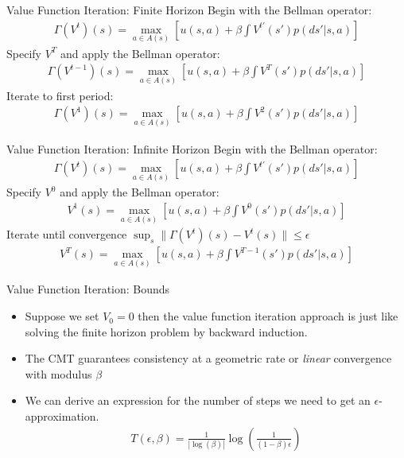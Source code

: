 \documentclass[xcolor=pdftex,dvipsnames,table,mathserif]{beamer}
\begin{document}
\begin{frame}{Value Function Iteration: Finite Horizon}
Begin with the Bellman operator:
\begin{eqnarray*}
\Gamma(V^t)(s) = \max_{a \in A(s)} \left[ u(s,a) + \beta \int V^{t'}(s')p(ds' | s,a) \right]
\end{eqnarray*}
Specify $V^T$ and apply the Bellman operator:
\begin{eqnarray*}
\Gamma(V^{t-1})(s) = \max_{a \in A(s)} \left[ u(s,a) + \beta \int V^{T}(s')p(ds' | s,a) \right]
\end{eqnarray*}
Iterate to first period:
\begin{eqnarray*}
\Gamma(V^1)(s) = \max_{a \in A(s)} \left[ u(s,a) + \beta \int V^{2}(s')p(ds' | s,a) \right]
\end{eqnarray*}
\end{frame}

\begin{frame}{Value Function Iteration: Infinite Horizon}
Begin with the Bellman operator:
\begin{eqnarray*}
\Gamma(V^t)(s) = \max_{a \in A(s)} \left[ u(s,a) + \beta \int V^{t'}(s')p(ds' | s,a) \right]
\end{eqnarray*}
Specify $V^0$ and apply the Bellman operator:
\begin{eqnarray*}
V^{1}(s) = \max_{a \in A(s)} \left[ u(s,a) + \beta \int V^{0}(s')p(ds' | s,a) \right]
\end{eqnarray*}
Iterate until convergence  $ \sup_s \| \Gamma(V^t)(s) - V^t(s) \| \leq \epsilon $
\begin{eqnarray*}
V^{T}(s) = \max_{a \in A(s)} \left[ u(s,a) + \beta \int V^{T-1}(s')p(ds' | s,a) \right]
\end{eqnarray*}
\end{frame}

\begin{frame}{Value Function Iteration: Bounds}
\begin{itemize}
\item Suppose we set $V_0 =0$ then the value function iteration approach is just like solving the finite horizon problem by backward induction.
\item The CMT guarantees consistency at a geometric rate or \textit{linear} convergence with modulus $\beta$
\item We can derive an expression for the number of steps we need to get an $\epsilon$-approximation.
\begin{eqnarray*}
T(\epsilon,\beta) = \frac{1}{| \log(\beta) | } \log \left (\frac{1}{(1-\beta)\epsilon} \right)
\end{eqnarray*}
\end{itemize}
\end{frame}
\end{document}
